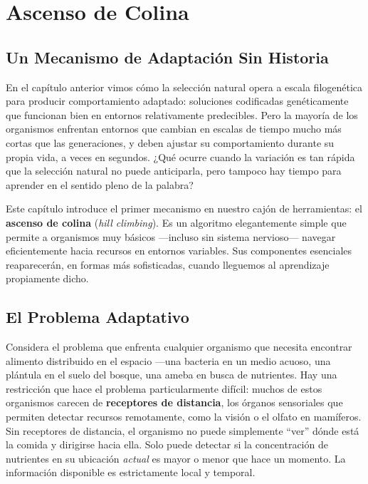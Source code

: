 \documentclass[
  letterpaper,
  DIV=11,
  numbers=noendperiod]{scrreprt}
\begin{document}
\chapter{Ascenso de Colina}\label{ascenso-de-colina}

\section{Un Mecanismo de Adaptación Sin
Historia}\label{un-mecanismo-de-adaptaciuxf3n-sin-historia}

En el capítulo anterior vimos cómo la selección natural opera a escala
filogenética para producir comportamiento adaptado: soluciones
codificadas genéticamente que funcionan bien en entornos relativamente
predecibles. Pero la mayoría de los organismos enfrentan entornos que
cambian en escalas de tiempo mucho más cortas que las generaciones, y
deben ajustar su comportamiento durante su propia vida, a veces en
segundos. ¿Qué ocurre cuando la variación es tan rápida que la selección
natural no puede anticiparla, pero tampoco hay tiempo para aprender en
el sentido pleno de la palabra?

Este capítulo introduce el primer mecanismo en nuestro cajón de
herramientas: el \textbf{ascenso de colina} (\emph{hill climbing}). Es
un algoritmo elegantemente simple que permite a organismos muy básicos
---incluso sin sistema nervioso--- navegar eficientemente hacia recursos
en entornos variables. Sus componentes esenciales reaparecerán, en
formas más sofisticadas, cuando lleguemos al aprendizaje propiamente
dicho.

\section{El Problema Adaptativo}\label{el-problema-adaptativo}

Considera el problema que enfrenta cualquier organismo que necesita
encontrar alimento distribuido en el espacio ---una bacteria en un medio
acuoso, una plántula en el suelo del bosque, una ameba en busca de
nutrientes. Hay una restricción que hace el problema particularmente
difícil: muchos de estos organismos carecen de \textbf{receptores de
distancia}, los órganos sensoriales que permiten detectar recursos
remotamente, como la visión o el olfato en mamíferos. Sin receptores de
distancia, el organismo no puede simplemente ``ver'' dónde está la
comida y dirigirse hacia ella. Solo puede detectar si la concentración
de nutrientes en su ubicación \emph{actual} es mayor o menor que hace un
momento. La información disponible es estrictamente local y temporal.
\end{document}
